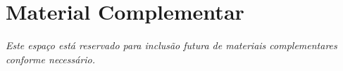 \chapter{Material Complementar}
\label{cap:apendice}

%
%
%

\textit{Este espaço está reservado para inclusão futura de materiais complementares conforme necessário.}
